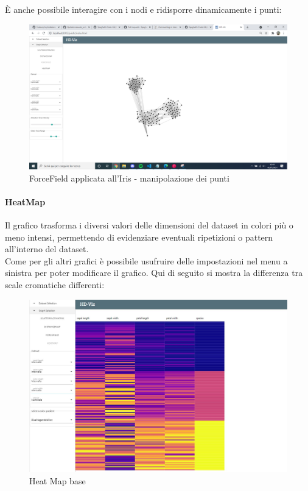 \documentclass[../manuale_utente.tex]{subfiles}
\begin{document}
È anche possibile interagire con i nodi e ridisporre dinamicamente i punti:

\begin{figure}[H]
	\centering
	\includegraphics[width=18cm]{src/img/ff/ff_iris_5}
	\caption{ForceField applicata all'Iris - manipolazione dei punti}
\end{figure}

\paragraph{HeatMap}
    \label{par:vis_heatmap}

Il grafico  trasforma i diversi valori delle dimensioni del dataset in colori più o meno intensi, permettendo di evidenziare eventuali ripetizioni o pattern all'interno del dataset. \\
Come per gli altri grafici è possibile usufruire delle impostazioni nel menu a sinistra per poter modificare il grafico. Qui di seguito si mostra la differenza tra scale cromatiche differenti:

\begin{figure}[H]
	\centering
	\includegraphics[width=18cm]{src/img/hm/heat_map_base.jpg}
	\caption{Heat Map base}
\end{figure}
\end{document}
